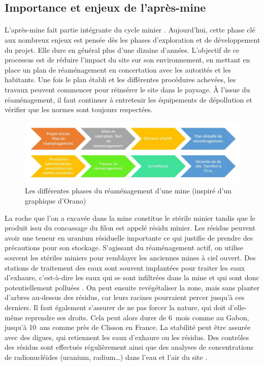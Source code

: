 \documentclass{article}
\begin{document}
\subsection{Importance et enjeux de l'après-mine}
\paragraph{} L’après-mine fait partie intégrante du cycle minier \cite{himeur_apres-mine_2020}. Aujourd’hui, cette phase clé aux nombreux enjeux est pensée dès les phases d’exploration et de développement du projet. Elle dure en général plus d'une dizaine d’années. L’objectif de ce processus est de réduire l’impact du site sur son environnement, en mettant en place un plan de réaménagement en concertation avec les autorités et les habitants. Une fois le plan établi et les différentes procédures achevées, les travaux peuvent commencer pour réinsérer le site dans le paysage. À l’issue du réaménagement, il faut continuer à entretenir les équipements de dépollution et vérifier que les normes sont toujours respectées.


\begin{figure}[H]
    \centering
    \includegraphics[width= \textwidth]{I_B_3.jpg}
    \caption{Les différentes phases du réaménagement d'une mine (inspiré d'un graphique d'Orano)}
    \label{fig:phases_reamenagement}
\end{figure}

La roche que l’on a excavée dans la mine constitue le stérile minier tandis que le produit issu du concassage du filon est appelé résidu minier. Les résidus peuvent avoir une teneur en uranium résiduelle importante ce qui justifie de prendre des précautions pour son stockage.
S'agissant du réaménagement actif, on utilise souvent les stériles miniers pour remblayer les anciennes mines à ciel ouvert.
Des stations de traitement des eaux sont souvent implantées pour traiter les eaux d’exhaure, c'est-à-dire les eaux qui se sont infiltrées dans la mine et qui sont donc potentiellement polluées \cite{schick_les_2020}.
On peut ensuite revégétaliser la zone, mais sans planter d’arbres au-dessus des résidus, car leurs racines pourraient percer jusqu’à ces derniers. Il faut également s’assurer de ne pas forcer la nature, qui doit d’elle-même reprendre ses droits. Cela peut alors durer de 6~mois comme au Gabon, jusqu'à 10~ans comme près de Clisson en France. La stabilité peut être assurée avec des digues, qui retiennent les eaux d’exhaure ou les résidus. Des contrôles des résidus sont effectués régulièrement ainsi que des analyses de concentrations de radionucléides (uranium, radium…) dans l’eau et l’air du site \cite{himeur_apres-mine_2020}.
\end{document}
